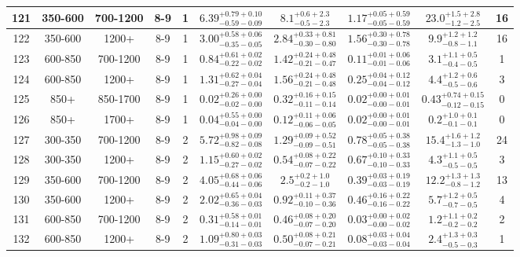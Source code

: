 \documentclass[11pt, oneside]{article}
\begin{document}
\begin{table}
{\begin{tabular}{ |c|c|c|c|c||c|c|c||c|c| }
121 & 350-600 & 700-1200 & 8-9 & 1 & $6.39^{+0.79+0.10}_{-0.59-0.09}$ & $8.1^{+0.6+2.3}_{-0.5-2.3}$ & $1.17^{+0.05+0.59}_{-0.05-0.59}$ & $23.0^{+1.5+2.8}_{-1.2-2.5}$ & 16 \\ \hline
122 & 350-600 & 1200+ & 8-9 & 1 & $3.00^{+0.58+0.06}_{-0.35-0.05}$ & $2.84^{+0.33+0.81}_{-0.30-0.80}$ & $1.56^{+0.30+0.78}_{-0.30-0.78}$ & $9.9^{+1.2+1.2}_{-0.8-1.1}$ & 16 \\ \hline
123 & 600-850 & 700-1200 & 8-9 & 1 & $0.84^{+0.61+0.02}_{-0.22-0.02}$ & $1.42^{+0.24+0.48}_{-0.21-0.47}$ & $0.11^{+0.01+0.06}_{-0.01-0.06}$ & $3.1^{+1.1+0.5}_{-0.4-0.5}$ & 1 \\ \hline
124 & 600-850 & 1200+ & 8-9 & 1 & $1.31^{+0.62+0.04}_{-0.27-0.04}$ & $1.56^{+0.24+0.48}_{-0.21-0.48}$ & $0.25^{+0.04+0.12}_{-0.04-0.12}$ & $4.4^{+1.2+0.6}_{-0.5-0.6}$ & 3 \\ \hline
125 & 850+ & 850-1700 & 8-9 & 1 & $0.02^{+0.26+0.00}_{-0.02-0.00}$ & $0.32^{+0.16+0.15}_{-0.11-0.14}$ & $0.02^{+0.00+0.01}_{-0.00-0.01}$ & $0.43^{+0.74+0.15}_{-0.12-0.15}$ & 0 \\ \hline
126 & 850+ & 1700+ & 8-9 & 1 & $0.04^{+0.55+0.00}_{-0.04-0.00}$ & $0.12^{+0.11+0.06}_{-0.06-0.05}$ & $0.02^{+0.00+0.01}_{-0.00-0.01}$ & $0.2^{+1.0+0.1}_{-0.1-0.1}$ & 0 \\ \hline
127 & 300-350 & 700-1200 & 8-9 & 2 & $5.72^{+0.98+0.09}_{-0.82-0.08}$ & $1.29^{+0.09+0.52}_{-0.09-0.51}$ & $0.78^{+0.05+0.38}_{-0.05-0.38}$ & $15.4^{+1.6+1.2}_{-1.3-1.0}$ & 24 \\ \hline
128 & 300-350 & 1200+ & 8-9 & 2 & $1.15^{+0.60+0.02}_{-0.27-0.02}$ & $0.54^{+0.08+0.22}_{-0.07-0.22}$ & $0.67^{+0.10+0.33}_{-0.10-0.33}$ & $4.3^{+1.1+0.5}_{-0.5-0.5}$ & 3 \\ \hline
129 & 350-600 & 700-1200 & 8-9 & 2 & $4.05^{+0.68+0.06}_{-0.44-0.06}$ & $2.5^{+0.2+1.0}_{-0.2-1.0}$ & $0.39^{+0.03+0.19}_{-0.03-0.19}$ & $12.2^{+1.3+1.3}_{-0.8-1.2}$ & 13 \\ \hline
130 & 350-600 & 1200+ & 8-9 & 2 & $2.02^{+0.65+0.04}_{-0.36-0.03}$ & $0.92^{+0.11+0.37}_{-0.10-0.36}$ & $0.46^{+0.16+0.22}_{-0.16-0.22}$ & $5.7^{+1.2+0.5}_{-0.7-0.5}$ & 4 \\ \hline
131 & 600-850 & 700-1200 & 8-9 & 2 & $0.31^{+0.58+0.01}_{-0.14-0.01}$ & $0.46^{+0.08+0.20}_{-0.07-0.20}$ & $0.03^{+0.00+0.02}_{-0.00-0.02}$ & $1.2^{+1.1+0.2}_{-0.2-0.2}$ & 2 \\ \hline
132 & 600-850 & 1200+ & 8-9 & 2 & $1.09^{+0.80+0.03}_{-0.31-0.03}$ & $0.50^{+0.08+0.21}_{-0.07-0.21}$ & $0.08^{+0.03+0.04}_{-0.03-0.04}$ & $2.4^{+1.3+0.3}_{-0.5-0.3}$ & 1 \\ \hline

\end{tabular}}
\end{table}
\end{document}
